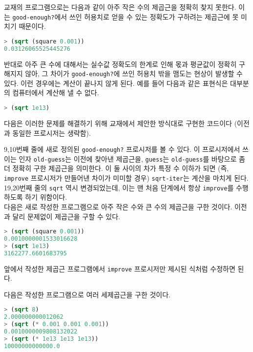 
교재의 프로그램으로는 다음과 같이 아주 작은 수의 제곱근을 정확히 찾지
못한다. 이는 \texttt{good-enough?}에서 쓰인 허용치로 얻을 수 있는 정확도가
구하려는 제곱근에 못 미치기 때문이다.

\begin{lstlisting}[language=Scheme]
> (sqrt (square 0.001))
0.03126065525445276
\end{lstlisting}

반대로 아주 큰 수에 대해서는 실수값 정확도의 한계로 인해 몫과 평균값이 정확히
구해지지 않아, 그 차이가 \texttt{good-enough?}에 쓰인 허용치 밖을 맴도는
현상이 발생할 수 있다. 이런 경우에는 계산이 끝나지 않게 된다. 예를 들어 다음과
같은 표현식은 대부분의 컴퓨터에서 계산해 낼 수 없다.

\begin{lstlisting}[language=Scheme]
> (sqrt 1e13)
\end{lstlisting}

다음은 이러한 문제를 해결하기 위해 교재에서 제안한 방식대로 구현한 코드이다
(이전과 동일한 프로시저는 생략함).


9,10번째 줄에 새로 정의된 \texttt{good-enough?} 프로시저를 볼 수 있다. 이
프로시저에서 쓰이는 인자 \texttt{old-guess}는 이전에 찾아낸 제곱근을, \texttt{guess}는
\texttt{old-guess}를 바탕으로 좀 더 정확히 구한 제곱근을 의미한다. 이 둘
사이의 차가 특정 수 이하가 되면 (즉, \texttt{improve} 프로시저가 만들어낸
차이가 미미할 경우) \texttt{sqrt-iter}는 계산을 마치게 된다. 19,20번째 줄의
\texttt{sqrt} 역시 변경되었는데, 이는 맨 처음 단계에서 항상 \texttt{improve}를
수행하도록 하기 위함이다.\\

다음은 새로 작성한 프로그램으로 아주 작은 수와 큰 수의 제곱근을 구한
것이다. 이전과 달리 문제없이 제곱근을 구할 수 있다.
\begin{lstlisting}[language=Scheme]
> (sqrt (square 0.001))
0.0010000001533016628
> (sqrt 1e13)
3162277.6601683795
\end{lstlisting}


앞에서 작성한 제곱근 프로그램에서 \texttt{improve} 프로시저만 제시된 식처럼
수정하면 된다.


다음은 작성한 프로그램으로 여러 세제곱근을 구한 것이다.
\begin{lstlisting}[language=Scheme]
> (sqrt 8)
2.000000000012062
> (sqrt (* 0.001 0.001 0.001))
0.0010000009808132022
> (sqrt (* 1e13 1e13 1e13))
10000000000000.0
\end{lstlisting}

